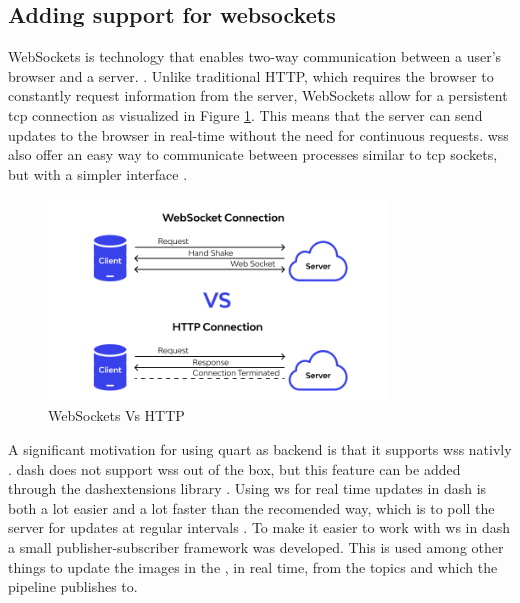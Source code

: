 \subsection{Adding support for websockets}
WebSockets is technology that enables two-way communication between a user's browser and a server.
\cite{farhutsWebSocketsBeginnersPart2019}.
Unlike traditional HTTP, which requires the browser to constantly request information from the server, WebSockets allow for a persistent \gls{tcp} connection as visualized in Figure \ref{fig:websockets_vs_http}\cite{tingUnderstandingWebSocketsIts2020}.
This means that the server can send updates to the browser in real-time without the need for continuous requests.
\glspl{ws} also offer an easy way to communicate between processes similar to \gls{tcp} sockets, but with a simpler interface \cite{kanakaAnswerDifferencesTCP2013}.
\begin{figure}[H]
    \centering
    \includegraphics[width=0.8\textwidth]{figures/gui/http_vs_ws.png}
    \caption{WebSockets Vs HTTP \cite{wallarmWebSocketVsHTTP}}
    \label{fig:websockets_vs_http}
\end{figure}

A significant motivation for using \gls{quart} as backend is that it supports \glspl{ws} nativly \cite{quartUsingWebsocketsQuart}.
\gls{dash} does not support \glspl{ws} out of the box, but this feature can be added through the \gls{dashextensions} library \cite{eriksenDashExtensionsWebSocket}.
Using \gls{ws} for real time updates in \gls{dash} is both a lot easier and a lot faster than the recomended way, which is to poll the server for updates at regular intervals \cite{plotlyLiveUpdatesDash}.
To make it easier to work with \gls{ws} in \gls{dash} a small publisher-subscriber framework was developed.
This is used among other things to update the images in the \srgui, in real time, from the topics  and  which the \gls{pipeline} publishes to.

